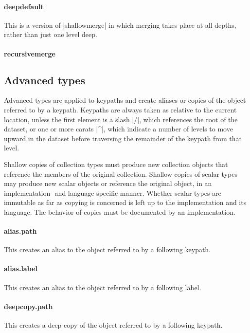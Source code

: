 \documentclass[11pt]{article}
\begin{document}
{{\paragraph{deepdefault}

This is a version of |shallowmerge| in which merging takes place at all depths, rather than just one level deep.


\paragraph{recursivemerge}



\subsection{Advanced types}
Advanced types are applied to keypaths and create aliases or copies of the object referred to by a keypath.  Keypaths are always taken as relative to the current location, unless the first element is a slash |/|, which references the root of the dataset, or one or more carats |^|, which indicate a number of levels to move upward in the dataset before traversing the remainder of the keypath from that level.

Shallow copies of collection types must produce new collection objects that reference the members of the original collection.  Shallow copies of scalar types may produce new scalar objects or reference the original object, in an implementation- and language-specific manner.  Whether scalar types are immutable as far as copying is concerned is left up to the implementation and its language.  The behavior of copies must be documented by an implementation.

\paragraph{alias.path}
This creates an alias to the object referred to by a following keypath.

\paragraph{alias.label}
This creates an alias to the object referred to by a following label.

\paragraph{deepcopy.path}
This creates a deep copy of the object referred to by a following keypath.

}}
\end{document}
